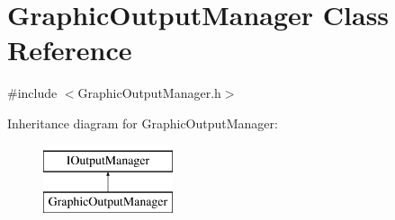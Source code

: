 \hypertarget{class_graphic_output_manager}{}\section{Graphic\+Output\+Manager Class Reference}
\label{class_graphic_output_manager}


{\ttfamily \#include $<$Graphic\+Output\+Manager.\+h$>$}

Inheritance diagram for Graphic\+Output\+Manager\+:\begin{figure}[H]
\begin{center}
\leavevmode
\includegraphics[height=2.000000cm]{class_graphic_output_manager}
\end{center}
\end{figure}
